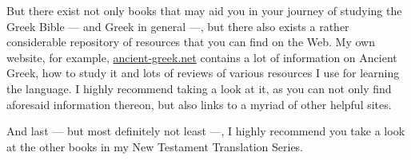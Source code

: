 But there exist not only books that may aid you in your journey of studying the Greek Bible — and Greek in general —, but there also exists a rather considerable repository of resources that you can find on the Web. My own website, for example, \url{ancient-greek.net} contains a lot of information on Ancient Greek, how to study it and lots of reviews of various resources I use for learning the language. I highly recommend taking a look at it, as you can not only find aforesaid information thereon, but also links to a myriad of other helpful sites. 

And last — but most definitely not least —, I highly recommend you take a look at the other books in my New Testament Translation Series.
